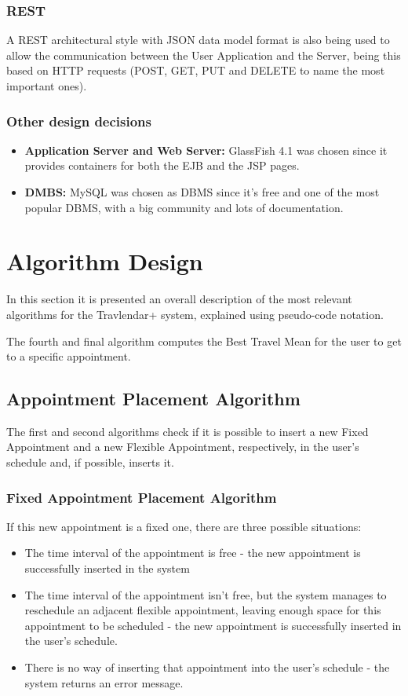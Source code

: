 \documentclass[12pt]{article}
\begin{document}
\subsubsection{REST} A REST architectural style with JSON data model format is also being used to allow the communication between the User Application and the Server, being this based on HTTP requests (POST, GET, PUT and DELETE to name the most important ones).

\subsubsection{Other design decisions}
\begin{itemize}
    \item \textbf{Application Server and Web Server:} GlassFish 4.1 was chosen since it provides containers for both the EJB and the JSP pages.
    \item \textbf{DMBS:} MySQL was chosen as DBMS since it's free and one of the most popular DBMS, with a big community and lots of documentation.
\end{itemize}

\section{Algorithm Design}
In this section it is presented an overall description of the most relevant algorithms for the Travlendar+ system, explained using pseudo-code notation.

The fourth and final algorithm computes the Best Travel Mean for the user to get to a specific appointment.

\subsection{Appointment Placement Algorithm}
The first and second algorithms check if it is possible to insert a new Fixed Appointment and a new Flexible Appointment, respectively, in the user's schedule and, if possible, inserts it.

\subsubsection{Fixed Appointment Placement Algorithm}

If this new appointment is a fixed one, there are three possible situations:
\begin{itemize}
    \item The time interval of the appointment is free - the new appointment is successfully inserted in the system
    \item The time interval of the appointment isn't free, but the system manages to reschedule an adjacent flexible appointment, leaving enough space for this appointment to be scheduled - the new appointment is successfully inserted in the user's schedule.
    \item There is no way of inserting that appointment into the user's schedule - the system returns an error message.
\end{itemize}
\end{document}
